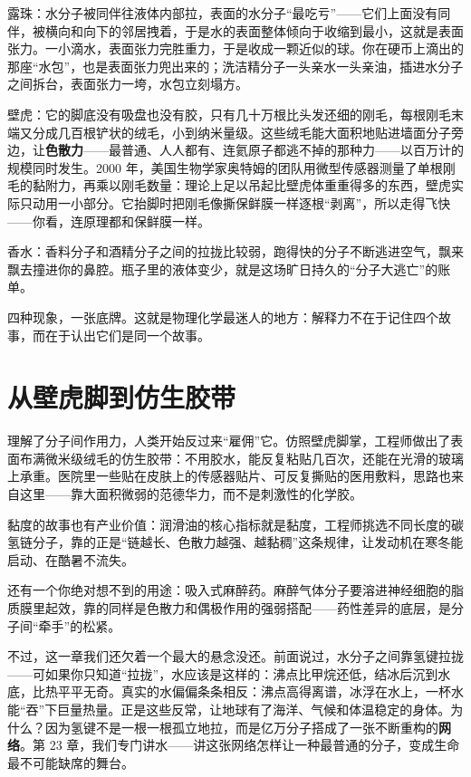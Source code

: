 露珠：水分子被同伴往液体内部拉，表面的水分子“最吃亏”——它们上面没有同伴，被横向和向下的邻居拽着，于是水的表面整体倾向于收缩到最小，这就是表面张力。一小滴水，表面张力完胜重力，于是收成一颗近似的球。你在硬币上滴出的那座“水包”，也是表面张力兜出来的；洗洁精分子一头亲水一头亲油，插进水分子之间拆台，表面张力一垮，水包立刻塌方。

壁虎：它的脚底没有吸盘也没有胶，只有几十万根比头发还细的刚毛，每根刚毛末端又分成几百根铲状的绒毛，小到纳米量级。这些绒毛能大面积地贴进墙面分子旁边，让\textbf{色散力}——最普通、人人都有、连氦原子都逃不掉的那种力——以百万计的规模同时发生。2000 年，美国生物学家奥特姆的团队用微型传感器测量了单根刚毛的黏附力，再乘以刚毛数量：理论上足以吊起比壁虎体重重得多的东西，壁虎实际只动用一小部分。它抬脚时把刚毛像撕保鲜膜一样逐根“剥离”，所以走得飞快——你看，连原理都和保鲜膜一样。

香水：香料分子和酒精分子之间的拉拢比较弱，跑得快的分子不断逃进空气，飘来飘去撞进你的鼻腔。瓶子里的液体变少，就是这场旷日持久的“分子大逃亡”的账单。

四种现象，一张底牌。这就是物理化学最迷人的地方：解释力不在于记住四个故事，而在于认出它们是同一个故事。

\section{从壁虎脚到仿生胶带}

理解了分子间作用力，人类开始反过来“雇佣”它。仿照壁虎脚掌，工程师做出了表面布满微米级绒毛的仿生胶带：不用胶水，能反复粘贴几百次，还能在光滑的玻璃上承重。医院里一些贴在皮肤上的传感器贴片、可反复撕贴的医用敷料，思路也来自这里——靠大面积微弱的范德华力，而不是刺激性的化学胶。

黏度的故事也有产业价值：润滑油的核心指标就是黏度，工程师挑选不同长度的碳氢链分子，靠的正是“链越长、色散力越强、越黏稠”这条规律，让发动机在寒冬能启动、在酷暑不流失。

还有一个你绝对想不到的用途：吸入式麻醉药。麻醉气体分子要溶进神经细胞的脂质膜里起效，靠的同样是色散力和偶极作用的强弱搭配——药性差异的底层，是分子间“牵手”的松紧。

不过，这一章我们还欠着一个最大的悬念没还。前面说过，水分子之间靠氢键拉拢——可如果你只知道“拉拢”，水应该是这样的：沸点比甲烷还低，结冰后沉到水底，比热平平无奇。真实的水偏偏条条相反：沸点高得离谱，冰浮在水上，一杯水能“吞”下巨量热量。正是这些反常，让地球有了海洋、气候和体温稳定的身体。为什么？因为氢键不是一根一根孤立地拉，而是亿万分子搭成了一张不断重构的\textbf{网络}。第 23 章，我们专门讲水——讲这张网络怎样让一种最普通的分子，变成生命最不可能缺席的舞台。

